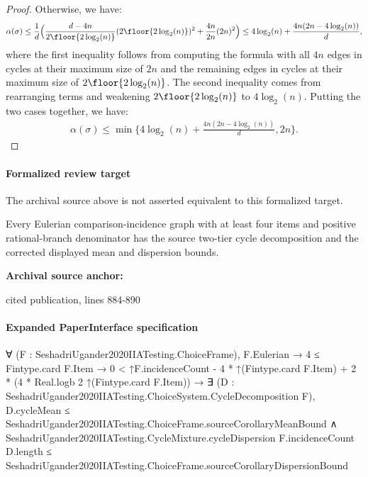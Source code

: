 \documentclass[10pt]{article}
\begin{document}
\begin{ReviewVerbatim}
\begin{proof}
			Otherwise, we have:
			\begin{align*}
			\alpha(\sigma) \leq \frac{1}{d} \Big(\frac{d - 4n}{2\floor{2 \log_2(n)}}(2\floor{2 \log_2(n)})^2 + \frac{4n}{2n}(2n)^2 \Big) \leq 4 \log_2(n) + \frac{4n(2n - 4 \log_2(n))}{d},
			\end{align*}
			where the first inequality follows from computing the formula with all $4n$ edges in cycles at their maximum size of $2n$ and the remaining edges in cycles at their maximum size of $2\floor{2 \log_2(n)}$. The second inequality comes from rearranging terms and weakening $2\floor{2 \log_2(n)}$ to $4 \log_2(n)$. Putting the two cases together, we have:
			\begin{align*}
			\alpha(\sigma) \leq \min \Big\{4 \log_2(n) + \frac{4n(2n - 4 \log_2(n))}{d}, 2n\Big\}.
			\end{align*}
		\end{proof}
\end{ReviewVerbatim}


\paragraph{Formalized review target}
The archival source above is not asserted equivalent to this formalized target.
\begin{ReviewVerbatim}
Every Eulerian comparison-incidence graph with at least four items and positive rational-branch denominator has the source two-tier cycle decomposition and the corrected displayed mean and dispersion bounds.
\end{ReviewVerbatim}

\textbf{Archival source anchor:} {\footnotesize\raggedright cited publication, lines 884-\allowbreak{}890\par}
\paragraph{Expanded PaperInterface specification}
\begin{ReviewVerbatim}
∀ (F : SeshadriUgander2020IIATesting.ChoiceFrame),
  F.Eulerian →
    4 ≤ Fintype.card F.Item →
      0 < ↑F.incidenceCount - 4 * ↑(Fintype.card F.Item) + 2 * (4 * Real.logb 2 ↑(Fintype.card F.Item)) →
        ∃ (D : SeshadriUgander2020IIATesting.ChoiceSystem.CycleDecomposition F),
          D.cycleMean ≤ SeshadriUgander2020IIATesting.ChoiceFrame.sourceCorollaryMeanBound ∧
            SeshadriUgander2020IIATesting.CycleMixture.cycleDispersion F.incidenceCount D.length ≤
              SeshadriUgander2020IIATesting.ChoiceFrame.sourceCorollaryDispersionBound
\end{ReviewVerbatim}
\end{document}
